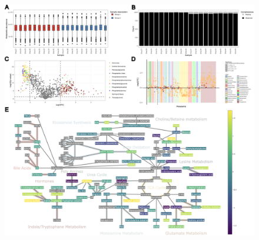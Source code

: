 \documentclass[12pt, a4paper]{article}
\begin{document}
\begin{figure}[t!]
    \centering
    \hspace*{-5mm}\includegraphics[scale=1.1]{figure2_2.png}
\end{figure}
\end{document}
